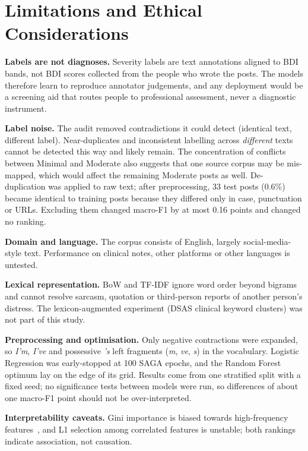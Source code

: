 \documentclass[conference]{IEEEtran}
\begin{document}
\section{Limitations and Ethical Considerations}\label{sec:limits}

\textbf{Labels are not diagnoses.} Severity labels are text annotations aligned to BDI bands, not BDI scores collected from the people who wrote the posts. The models therefore learn to reproduce annotator judgements, and any deployment would be a screening aid that routes people to professional assessment, never a diagnostic instrument.

\textbf{Label noise.} The audit removed contradictions it could detect (identical text, different label). Near-duplicates and inconsistent labelling across \emph{different} texts cannot be detected this way and likely remain. The concentration of conflicts between Minimal and Moderate also suggests that one source corpus may be mis-mapped, which would affect the remaining Moderate posts as well. De-duplication was applied to raw text; after preprocessing, 33 test posts (0.6\%) became identical to training posts because they differed only in case, punctuation or URLs. Excluding them changed macro-F1 by at most 0.16 points and changed no ranking.

\textbf{Domain and language.} The corpus consists of English, largely social-media-style text. Performance on clinical notes, other platforms or other languages is untested.

\textbf{Lexical representation.} BoW and TF-IDF ignore word order beyond bigrams and cannot resolve sarcasm, quotation or third-person reports of another person's distress. The lexicon-augmented experiment (DSAS clinical keyword clusters) was not part of this study.

\textbf{Preprocessing and optimisation.} Only negative contractions were expanded, so \textit{I'm}, \textit{I've} and possessive \textit{'s} left fragments (\textit{m}, \textit{ve}, \textit{s}) in the vocabulary. Logistic Regression was early-stopped at 100 SAGA epochs, and the Random Forest optimum lay on the edge of its grid. Results come from one stratified split with a fixed seed; no significance tests between models were run, so differences of about one macro-F1 point should not be over-interpreted.

\textbf{Interpretability caveats.} Gini importance is biased towards high-frequency features~\cite{strobl2007bias}, and L1 selection among correlated features is unstable; both rankings indicate association, not causation.
\end{document}
